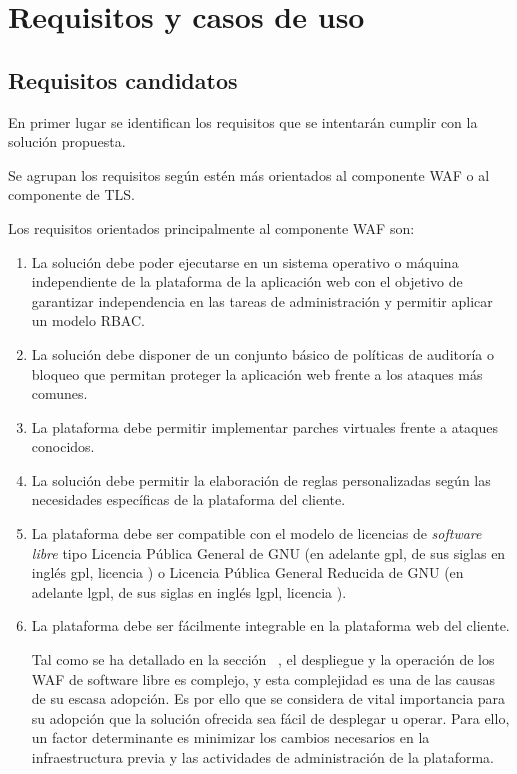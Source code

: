 \chapter{Requisitos y casos de uso}
\section{Requisitos candidatos}
\par En primer lugar se identifican los requisitos que se intentarán cumplir con la solución propuesta.
\par Se agrupan los requisitos según estén más orientados al componente WAF o al componente de TLS.
\par Los requisitos orientados principalmente al componente WAF son:
\begin{enumerate}
  \item \label{req:independence} La solución debe poder ejecutarse en un sistema operativo o máquina independiente de la plataforma de la aplicación web con el
    objetivo de garantizar independencia en las tareas de administración y permitir aplicar un modelo RBAC.

  \item \label{req:commonattacks} La solución debe disponer de un conjunto básico de políticas de auditoría o bloqueo que permitan proteger la aplicación web
    frente a los ataques más comunes.

  \item La plataforma debe permitir implementar parches virtuales frente a ataques conocidos.

  \item La solución debe permitir la elaboración de reglas personalizadas según las necesidades específicas de la plataforma del cliente.

  \item \label{req:softwarelibre} La plataforma debe ser compatible con el modelo de licencias de {\em software libre\cite{softwarelibre}} tipo Licencia Pública
    General de GNU (en adelante \acrshort{gpl}, de  sus siglas en inglés \acrlong{gpl}, licencia \cite{gpl}) o Licencia Pública General Reducida de GNU (en adelante \acrshort{lgpl},
    de sus siglas en inglés \acrlong{lgpl}, licencia \cite{lgpl}).

  \item \label{req:facilidad} La plataforma debe ser fácilmente integrable en la plataforma web del cliente.
    \par Tal como se ha detallado en la sección ~, el despliegue y la operación de los WAF de software libre es complejo, y esta complejidad es una de las causas de su escasa adopción. Es por ello que se considera de
    vital importancia para su adopción que la solución ofrecida sea fácil de desplegar u operar. Para ello, un factor determinante es minimizar los cambios necesarios en la infraestructura previa y  las actividades de administración de la
    plataforma.


\end{enumerate}
